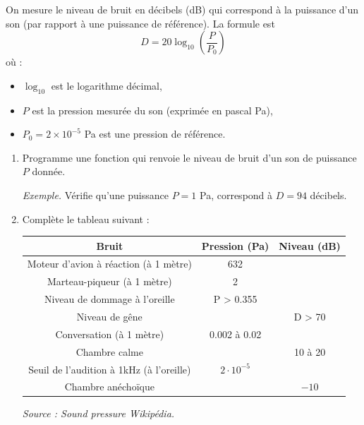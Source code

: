 \documentclass[11pt,class=report,crop=false]{standalone}
\begin{document}
\begin{activite}


On mesure le niveau de bruit en décibels (dB) qui correspond à la puissance d'un son (par rapport à une puissance de référence). La formule est 
$$D = 20 \log_{10} \left(\frac{P}{P_0} \right)$$
où :
\begin{itemize}
  \item $\log_{10}$ est le logarithme décimal,
  \item $P$ est la pression mesurée du son (exprimée en pascal Pa),
  \item $P_0 = 2 \times 10^{-5}$ Pa est une pression de référence.
\end{itemize}  


  \begin{enumerate}
    \item Programme une fonction  qui renvoie le niveau de bruit d'un son de puissance $P$ donnée.
    
    \emph{Exemple.} Vérifie qu'une puissance $P = 1$ Pa, correspond à $D = 94$ décibels.    
    
    \item Complète le tableau suivant :
    

\begin{center}
\begin{tabular}{|c|c|c|}
\hline
Bruit &	Pression (Pa) &	Niveau (dB)  \\ \hline\hline

Moteur d'avion à réaction (à 1 mètre) & 632 & \\\hline
Marteau-piqueur (à 1 mètre) & 2 & \\\hline
Niveau de dommage à l'oreille & P > 0.355 & \\\hline
Niveau de gêne & & D > 70 \\\hline
Conversation (à 1 mètre) &  0.002 à 0.02 & \\\hline
Chambre calme & &  10 à 20 \\\hline
Seuil de l'audition à 1kHz (à l'oreille) &  $2 \cdot 10^{-5}$ & \\\hline
Chambre anéchoïque & &  $-10$ \\ \hline
\end{tabular}

\smallskip 

\emph{Source : \og{}Sound pressure\fg{}  Wikipédia.}
\end{center}  
   
  \end{enumerate}
 
\end{activite}
\end{document}
